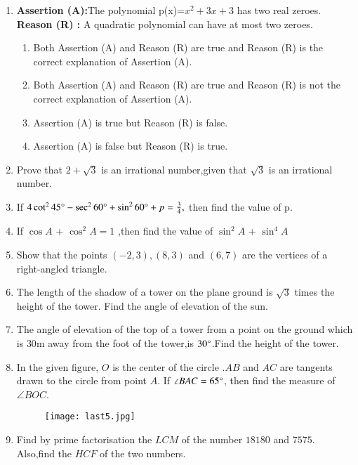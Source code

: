 \documentclass[12pt,-letter paper]{article}
\providecommand{\brak}[1]{\ensuremath{\left(#1\right)}}
\begin{document}
\begin{enumerate}
   
	\item \textbf{Assertion (A):}The polynomial p(x)=$x^{2}+3x+3$ has two real zeroes.
\\		\textbf{Reason (R) :} A quadratic polynomial can have at most two zeroes.
\begin{enumerate}
\item Both Assertion (A) and Reason (R) are true and Reason (R) is the correct explanation of Assertion (A). 
\item Both Assertion (A) and Reason (R) are true and Reason (R) is not the correct explanation of Assertion (A).
\item Assertion (A) is true but Reason (R) is false.
\item Assertion (A) is false but Reason (R) is true.
\end{enumerate}

\item Prove that $ 2+\sqrt3 $ is an irrational number,given that $ \sqrt3 $ is an irrational number.

\item If $4 \cot^{2}45\degree-\sec^{2}60\degree+\sin^{2}60\degree+p=\frac{3}{4},$ then find the value of p.

\item If $\cos A$ + $\cos^{2}A = 1$ ,then find the value of $\sin^{2}A$ + $\sin^{4}A$

\item Show that the points $\brak{-2,3}, \brak{8,3}$ and $\brak{6,7} $ are the vertices of a right-angled triangle.
\item The length of the shadow of a tower on the plane ground is $ \sqrt3 $ times the height of the tower. Find the angle of elevation of the sun.

\item The angle of elevation of the top of a tower from a point on the ground which is $30 \mathrm{m}$ away from the foot of the tower,is $30\degree$.Find the height of the tower.

\item In the given figure, $O$ is the center of the circle .$AB$ and $AC$ are tangents drawn to the circle from point $A$. If $\angle BAC = 65\degree $, then find the measure of $\angle BOC $.
	\begin{figure}[!ht]
		\centering
		\texttt{[image: last5.jpg]}
		\caption{}
		\label{fig:enter-label}
	\end{figure}
\newpage		
\item Find by prime factorisation the $LCM$ of the number $18180$ and $7575$. Also,find the $HCF$ of the two numbers.


\end{enumerate}
\end{document}
